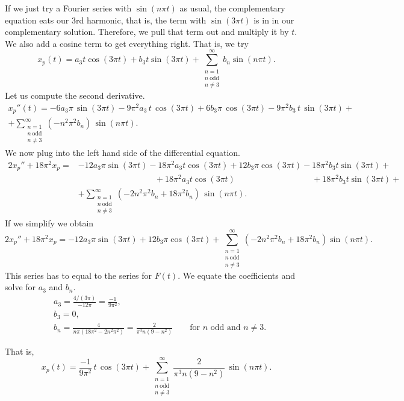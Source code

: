 \documentclass[12pt]{book}
\begin{document}
\begin{example}
If we just try a Fourier series with $\sin (n\pi t)$ as usual,
the complementary equation eats our 3rd harmonic, that is, the term
with $\sin(3 \pi t)$
is in
in our complementary solution.
Therefore, we pull that term out and
multiply it by $t$.  We also add a cosine term to get everything right.
That is, we try
\begin{equation*}
x_p(t) =
a_3
t \cos (3 \pi t )
+
b_3
t \sin (3 \pi t)
+
\sum_{\substack{n=1 \\ n~\text{odd} \\ n\not= 3}}^\infty
b_n
\sin (n \pi t) . 
\end{equation*}
Let us compute the second derivative.
\begin{multline*}
x_p''(t) =
- 6 a_3
\pi \, \sin (3 \pi t) - 9\pi^2 a_3 \, t \, \cos (3 \pi t)
+
6 b_3
\pi \, \cos (3 \pi t) - 9\pi^2 b_3 \, t \, \sin (3 \pi t)
+
\\
+
\sum_{\substack{n=1 \\ n~\text{odd} \\ n\not= 3}}^\infty
(-n^2 \pi^2 b_n ) \,
\sin (n \pi t) . 
\end{multline*}
We now plug into the left hand side of the differential equation.
\begin{align*}
2x_p'' + 18\pi^2 x_p = & 
- 12 a_3 \pi \sin (3 \pi t)
- 18\pi^2 a_3 t \cos (3 \pi t)
+ 12 b_3 \pi \cos (3 \pi t)
- 18\pi^2 b_3 t \sin (3 \pi t)
+
\\
& \phantom{\, - 12 a_3 \pi \sin (3 \pi t)} ~
+ 18 \pi^2 a_3 t \cos (3 \pi t)
\phantom{\, + 12 b_3 \pi \cos (3 \pi t)} ~
+ 18 \pi^2 b_3 t \sin (3 \pi t)
+
\\
& + \sum_{\substack{n=1 \\ n~\text{odd} \\ n\not= 3}}^\infty
(-2n^2 \pi^2 b_n + 18\pi^2 b_n) \,
\sin (n \pi t) . 
\end{align*}
If we simplify we obtain
\begin{equation*}
2x_p'' + 18\pi^2 x_p =
- 12 a_3
\pi \sin (3 \pi t)
+
12 b_3
\pi \cos (3 \pi t)
+
\sum_{\substack{n=1 \\ n~\text{odd} \\ n\not= 3}}^\infty
(-2n^2 \pi^2 b_n + 18\pi^2 b_n)
\sin (n \pi t) . 
\end{equation*}
This series has to equal to the series for $F(t)$.
We equate the coefficients and solve for $a_3$ and $b_n$.
\begin{align*}
& a_3 = \frac{4/(3\pi)}{-12\pi} = \frac{-1}{9\pi^2} , \\
& b_3 = 0 , \\
& b_n = \frac{4}{n\pi(18\pi^2 - 2n^2 \pi^2)} 
= \frac{2}{\pi^3 n(9 - n^2)} \qquad \text{for } n \text{ odd and } n\not=3 .
\end{align*}

That is,
\begin{equation*}
x_p(t) =
\frac{-1}{9\pi^2}
\,
t \, \cos (3 \pi t)
+
\sum_{\substack{n=1 \\ n~\text{odd} \\ n\not= 3}}^\infty
\frac{2}{\pi^3 n(9 - n^2)} \,
\sin (n \pi t) . 
\end{equation*}
\end{example}
\end{document}
